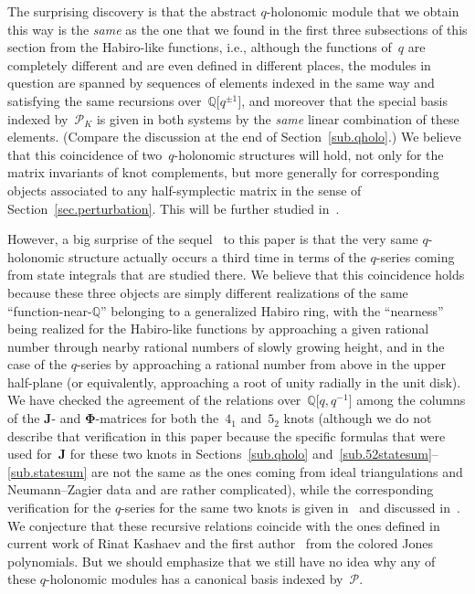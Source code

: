 \documentclass[pdftex]{sigma}
\numberwithin{equation}{section}
\def\calP{\mathcal P}
\def\calP{\mathcal P}
\def\Q{\mathbb Q}
\def\i{^{-1}}
\def\bJ{J} \def\bJ{\mathbf{J}}
\def\bPhi{\mathbf\Phi}
\begin{document}
The surprising discovery is that the abstract \hbox{$q$-holonomic} module that we
obtain this way is the \emph{same} as the one that we found in the first three
subsections of this section from the Habiro-like functions, i.e., although the functions
of~$q$ are completely different and are even defined in different places, the modules in
question are spanned by sequences of elements indexed in the same way and satisfying the
same recursions over~$\Q\big[q^{\pm1}\big]$, and moreover that the special basis indexed
by~$\calP_K$ is given in both systems by the \emph{same} linear combination of these
elements. (Compare the discussion at the end of Section~\ref{sub.qholo}.)
We believe that this coincidence of two~$q$-holonomic structures will hold,
not only for the matrix invariants of knot complements, but more generally for
corresponding objects associated to any half-symplectic matrix in the sense of
Section~\ref{sec.perturbation}. This will be further studied in~\cite{GSZ:habiro}.

However, a big surprise of the sequel~\cite{GZ:qseries} to this paper is that the very
same $q$-holonomic structure actually occurs a third time in terms of the $q$-series
coming from state integrals that are studied there. We believe that this coincidence
holds because these three objects are simply different realizations of the same
``function-near-$\Q$'' belonging to a generalized Habiro ring, with the ``nearness''
being realized for the Habiro-like functions by approaching a given rational number
through nearby rational numbers of slowly growing height, and in the case of the
$q$-series by approaching a rational number from above in the upper half-plane
(or equivalently, approaching a root of unity radially in the unit disk). We have
checked the agreement of the relations over~$\Q\big[q,q\i\big]$ among the columns of the
$\bJ$- and $\bPhi$-matrices for both the~$4_1$ and~$5_2$ knots (although we do not
describe that verification in this paper because the specific formulas that were used
for~$\bJ$ for these two knots in Sections~\ref{sub.qholo}
and~\ref{sub.52statesum}--\ref{sub.statesum} are not the same as the ones coming from
ideal triangulations and Neumann--Zagier data and are rather complicated), while the
corresponding verification for the $q$-series for the same two knots is given
in~\cite{GGM} and discussed in~\cite{GZ:qseries}. We conjecture that these
recursive relations coincide with the ones defined in current work of Rinat
Kashaev and the first author~\cite{GK:desc} from the colored Jones polynomials.
But we should emphasize that we still have no idea
why any of these $q$-holonomic modules has a canonical basis indexed by~$\calP$.
\end{document}
